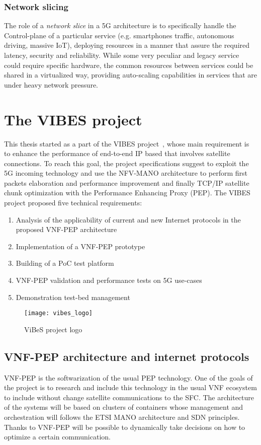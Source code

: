 \subsubsection{Network slicing}
\label{chap:background:sec:5g:sub:ns}
The role of a \emph{network slice} in a 5G architecture is to specifically
handle the Control-plane of a particular service (e.g. smartphones traffic,
autonomous driving, massive IoT), deploying resources in a manner that assure
the required latency, security and reliability. While some very peculiar and
legacy service could require specific hardware, the common resources between
services could be shared in a virtualized way, providing auto-scaling
capabilities in services that are under heavy network pressure.

\section{The VIBES project}
This thesis started as a part of the VIBES project~\cite{vibesesa}, whose main
requirement is to enhance the performance of end-to-end IP based that involves
satellite connections. To reach this goal, the project specifications suggest to
exploit the 5G incoming technology and use the NFV-MANO architecture to perform
first packets elaboration and performance improvement and finally TCP/IP
satellite chunk optimization with the Performance Enhancing Proxy (PEP). The
VIBES project proposed five technical requirements:
\begin{enumerate}
  \item Analysis of the applicability of current and new Internet protocols in
  the proposed VNF-PEP architecture
  \item Implementation of a VNF-PEP prototype
  \item Building of a PoC test platform
  \item VNF-PEP validation and performance tests on 5G use-cases
  \item Demonstration test-bed management
\end{enumerate}

\begin{figure}[t]
 \centering
 \texttt{[image: vibes\_logo]}
 \caption{ViBeS project logo}
 \label{chap:background:img:vibes_logo}
\end{figure}

\subsection{VNF-PEP architecture and internet protocols}
VNF-PEP is the softwarization of the usual PEP technology. One of the goals of
the project is to research and include this technology in the usual VNF
ecosystem to include without change satellite communications to the SFC. The
architecture of the systems will be based on clusters of containers whose
management and orchestration will follows the ETSI MANO architecture and SDN
principles. Thanks to VNF-PEP will be possible to dynamically take decisions on
how to optimize a certain communication.

